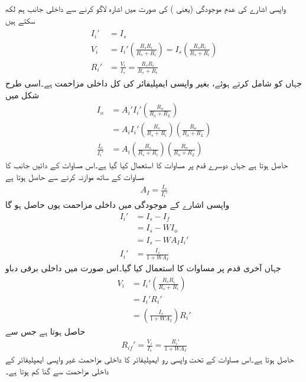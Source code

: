 واپسی اشارے کی  عدم موجودگی (یعنی ) کی صورت میں اشارہ   لاگو کرنے سے داخلی جانب  ہم لکھ سکتے ہیں
\begin{gather}
\begin{aligned}
I_i' &=I_s\\
V_i &= I_i' \left(\frac{R_s R_i}{R_s+R_i} \right ) =I_s \left(\frac{R_s R_i}{R_s+R_i} \right ) \\
R_i' &=\frac{V_i}{I_s}=\frac{R_s R_i}{R_s+R_i}
\end{aligned}
\end{gather}
جہاں  کو شامل کرتے ہوئے،  بغیر واپسی ایمپلیفائر کی کل داخلی مزاحمت ہے۔اسی طرح شکل  میں 
\begin{align*}
I_o &= A_i'  I_i' \left( \frac{R_o}{R_o+R_L} \right )  \\
&=A_i  I_i' \left (\frac{R_s}{R_s+R_i} \right ) \left( \frac{R_o}{R_o+R_L} \right )  \\
 \frac{I_o}{I_i'} &=A_i \left (\frac{R_s}{R_s+R_i} \right ) \left( \frac{R_o}{R_o+R_L} \right )  
\end{align*}
حاصل ہوتا ہے جہاں دوسرے قدم پر مساوات  کا استعمال کیا گیا ہے۔اس مساوات کے دائیں جانب کا مساوات  کے ساتھ موازنہ کرنے سے حاصل ہوتا ہے
\begin{align} \label{مساوات_واپسی_رو_ایمپلیفائر_کی_افزائش_ب}
A_I=\frac{I_o}{I_i'}
\end{align}
واپسی اشارے کے موجودگی میں داخلی مزاحمت یوں حاصل ہو گا
\begin{align*}
I_i' &=I_s-I_f  \\
&=I_s -W I_o \\
&=I_s -W A_I I_i' \\
I_i' &=\frac{I_s}{1+W A_I}
\end{align*}
جہاں آخری قدم پر مساوات  کا استعمال کیا گیا۔اس صورت میں داخلی برقی دباو
\begin{align*}
V_i &= I_i' \left(\frac{R_s R_i}{R_s+R_i} \right ) \\
&=I_i' R_i' \\
& =\left(\frac{ I_s }{1+W A_I} \right) R_i' 
\end{align*}
حاصل ہوتا ہے جس سے 
\begin{align}\label{مساوات_واپسی_برقی_رو_کی_داخلی_مزاحمت}
R_{if}'=\frac{V_i}{I_s} =\frac{ R_i'}{1+W A_I}
\end{align}
حاصل ہوتا ہے۔اس مساوات کے تحت واپسی رو ایمپلیفائر  کا داخلی مزاحمت   غیر واپسی ایمپلیفائر کے داخلی مزاحمت  سے  گنا کم ہوتا ہے۔

